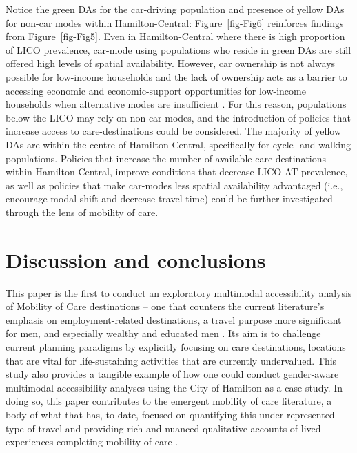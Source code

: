 \documentclass[
  authoryear,
  preprint,
  3p]{elsarticle}
\begin{document}
Notice the green DAs for the car-driving population and presence of
yellow DAs for non-car modes within Hamilton-Central:
Figure~\ref{fig-Fig6} reinforces findings from Figure~\ref{fig-Fig5}.
Even in Hamilton-Central where there is high proportion of LICO
prevalence, car-mode using populations who reside in green DAs are still
offered high levels of spatial availability. However, car ownership is
not always possible for low-income households and the lack of ownership
acts as a barrier to accessing economic and economic-support
opportunities for low-income households \citep{morrisDoesLackingCar2020}
when alternative modes are insufficient
\citep{kleinTransitionsOutCar2023}. For this reason, populations below
the LICO may rely on non-car modes, and the introduction of policies
that increase access to care-destinations could be considered. The
majority of yellow DAs are within the centre of Hamilton-Central,
specifically for cycle- and walking populations. Policies that increase
the number of available care-destinations within Hamilton-Central,
improve conditions that decrease LICO-AT prevalence, as well as policies
that make car-modes less spatial availability advantaged (i.e.,
encourage modal shift and decrease travel time) could be further
investigated through the lens of mobility of care.

\section{Discussion and conclusions}\label{discussion-and-conclusions}

This paper is the first to conduct an exploratory multimodal
accessibility analysis of Mobility of Care destinations -- one that
counters the current literature's emphasis on employment-related
destinations, a travel purpose more significant for men, and especially
wealthy and educated men
\citep{lawWomenTransportNew1999, hansonGenderMobilityNew2010}. Its aim
is to challenge current planning paradigms by explicitly focusing on
care destinations, locations that are vital for life-sustaining
activities that are currently undervalued. This study also provides a
tangible example of how one could conduct gender-aware multimodal
accessibility analyses using the City of Hamilton as a case study. In
doing so, this paper contributes to the emergent mobility of care
literature, a body of what that has, to date, focused on quantifying
this under-represented type of travel
\citep{gomezvaroAccountingCareEveryday2023, murillomunarCaregiversMoveGender2023, ravensbergenExploratoryAnalysisMobility2022, sanchezdemadariagaMobilityCareIntroducing2013, sanchezdemadariagaMeasuringMobilitiesCare2019, shumanCanMobilityCare2023}
and providing rich and nuanced qualitative accounts of lived experiences
completing mobility of care
\citep{orjuelaReconsideringMobilityCare2023, ravensbergenVelomobilitiesCareLowcycling2020, sersliRidingAloneTogether2020}.
\end{document}
